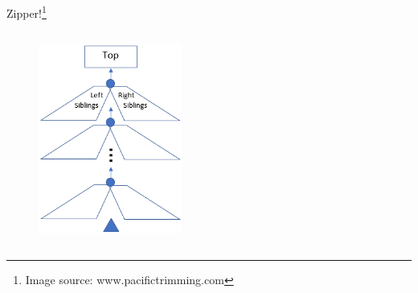 \begin{frame}[fragile]

Zipper!\footnote[frame]{Image source: www.pacifictrimming.com}

\begin{columns}
\begin{column}{0.75\textwidth}
\begin{figure}
\centering
\includegraphics[width=0.6\textwidth]{figure/zipper}
\end{figure}
\end{column}
\begin{column}{0.3\textwidth}
\begin{figure}

\end{figure}
\end{column}
\end{columns}
\end{frame}

